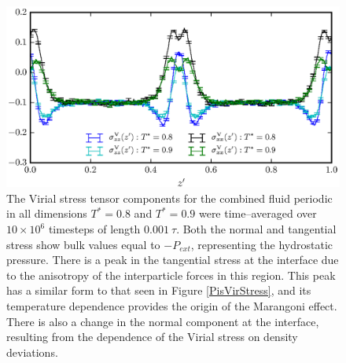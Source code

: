 \begin{figure}[h!]
\centering
\includegraphics[scale=1.0]{Period10VirStress}
\caption{The Virial stress tensor components for the combined fluid periodic in all dimensions $T^{*} = 0.8$ and $T^{*} = 0.9$ were time--averaged over $10 \times 10^{6}$ timesteps of length $0.001\ \tau$.
Both the normal and tangential stress show bulk values equal to $-P_{ext}$, representing the hydrostatic pressure.
There is a peak in the tangential stress at the interface due to the anisotropy of the interparticle forces in this region.
This peak has a similar form to that seen in Figure \ref{PisVirStress}, and its temperature dependence provides the origin of the Marangoni effect.
There is also a change in the normal component at the interface, resulting from the dependence of the Virial stress on density deviations.
}
\label{Period10VirStress}
\end{figure}

